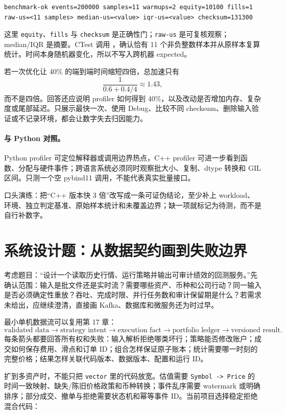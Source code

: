 \begin{lstlisting}[numbers=none]
benchmark-ok events=200000 samples=11 warmups=2 equity=10100 fills=1 raw-us=<11 samples> median-us=<value> iqr-us=<value> checksum=131300
\end{lstlisting}

这里 \texttt{equity}、\texttt{fills} 与 \texttt{checksum} 是正确性门；\texttt{raw-us} 是可复核观察；median/IQR 是摘要。CTest 调用 ，确认恰有 11 个非负整数样本并从原样本复算统计。时间本身随机器变化，所以不写入跨机器 expected。

若一次优化让 40\% 的端到端时间缩短四倍，总加速只有
\[
\frac{1}{0.6+0.4/4}\approx1.43,
\]
而不是四倍。回答还应说明 profiler 如何得到 40\%，以及改动是否增加内存、复杂度或尾部延迟。只展示最快一次、使用 Debug、比较不同 checksum、删除输入验证或不记录环境，都会让数字失去归因能力。

\paragraph{与 Python 对照。}
Python profiler 可定位解释器或调用边界热点，C++ profiler 可进一步看到函数、分配与硬件事件；跨语言系统必须同时观察批大小、复制、dtype 转换和 GIL 区间。只测一个空 pybind11 调用，不能代表真实批量接口。

口头演练：把“C++ 版本快 3 倍”改写成一条可证伪结论，至少补上 workload、环境、独立判定基准、原始样本统计和未覆盖边界；缺一项就标记为待测，而不是自行补数字。

\section{系统设计题：从数据契约画到失败边界}

考虑题目：“设计一个读取历史行情、运行策略并输出可审计绩效的回测服务。”先确认范围：输入是批文件还是实时流？需要哪些资产、币种和公司行动？同一输入是否必须确定性重放？吞吐、完成时限、并行任务数和审计保留期是什么？若需求未给出，应继续澄清，直接画 Kafka、数据库和微服务还为时过早。

最小单机数据流可以复用第 17 章：
\[
\text{validated data}\rightarrow\text{strategy intent}\rightarrow
\text{execution fact}\rightarrow\text{portfolio ledger}\rightarrow
\text{versioned result}.
\]
每条箭头都要回答所有权和失败：输入解析拒绝哪类坏行；策略能否修改账户；成交如何保存费用、滑点和订单 ID；组合怎样保证原子账本；统计需要哪一时刻的完整价格；结果怎样关联代码版本、数据版本、配置和运行 ID。

扩到多资产时，不能只把 \texttt{vector} 里的代码放宽。估值需要 \texttt{Symbol -> Price} 的时间一致映射、缺失/陈旧价格政策和币种转换；事件乱序需要 watermark 或明确排序；部分成交、撤单与拒绝需要状态机和幂等事件 ID。当前项目选择稳定拒绝混合代码：

